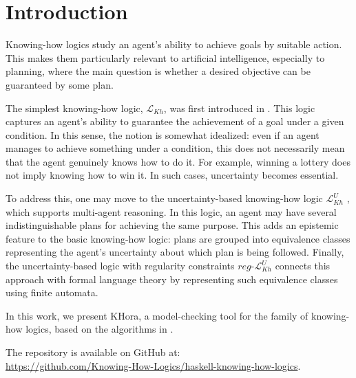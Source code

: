 \section{Introduction}

Knowing-how logics study an agent's ability to achieve goals by suitable action. This makes them particularly relevant to artificial intelligence, especially to planning, where the main question is whether a desired objective can be guaranteed by some plan.\par

The simplest knowing-how logic, $\mathcal{L}_{Kh}$, was first introduced in \cite{Wang2015}. This logic captures an agent's ability to guarantee the achievement of a goal under a given condition. In this sense, the notion is somewhat idealized: even if an agent manages to achieve something under a condition, this does not necessarily mean that the agent genuinely knows how to do it. For example, winning a lottery does not imply knowing how to win it. In such cases, uncertainty becomes essential.\par

To address this, one may move to the uncertainty-based knowing-how logic $\mathcal{L}^U_{Kh}$ \cite{Areces2021}, which supports multi-agent reasoning. In this logic, an agent may have several indistinguishable plans for achieving the same purpose. This adds an epistemic feature to the basic knowing-how logic: plans are grouped into equivalence classes representing the agent's uncertainty about which plan is being followed. Finally, the uncertainty-based logic with regularity constraints $reg\text{-}\mathcal{L}^U_{Kh}$ \cite{Demri2023} connects this approach with formal language theory by representing such equivalence classes using finite automata.\par

In this work, we present \textsf{KHora}, a model-checking tool for the family of knowing-how logics, based on the algorithms in \cite{Demri2023}. \par

The repository is available on GitHub at:\\
\url{https://github.com/Knowing-How-Logics/haskell-knowing-how-logics}.